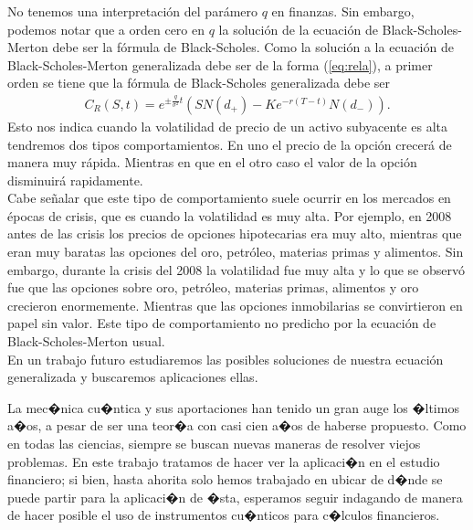 \documentclass[portrait, a0b,final]{a0poster}%
\numberwithin{equation}{section}
\newenvironment{poster}{
  \begin{center}
  \begin{minipage}[c]{0.98\textwidth}
}{
  \end{minipage}
  \end{center}
}
\newenvironment{pcolumn}[1]{
  \begin{minipage}{#1\textwidth}
  \begin{center}
}{
  \end{center}
  \end{minipage}
}
\newcommand{\pbox}[4]{
\psshadowbox[#3]{
\begin{minipage}[t][#2][t]{#1}
#4
\end{minipage}
}}
\begin{document}
\begin{poster}
\begin{center}
\begin{pcolumn}{0.32}
{No tenemos una interpretaci\'on del par\'amero $q$ en finanzas. Sin embargo, podemos notar que a orden cero en $q$ la soluci\'on de la ecuaci\'on de Black-Scholes-Merton 
debe ser la f\'ormula de Black-Scholes. Como la soluci\'on a la ecuaci\'on de Black-Scholes-Merton generalizada  
debe ser   de la forma (\ref{eq:rela}),  a primer orden se tiene que la f\'ormula de Black-Scholes generalizada debe ser 
%
\begin{eqnarray}
C_{R}(S,t)= e^{\pm \frac{q}{\sigma^{2}} t}  \left(SN(d_{+})-Ke^{-r(T-t)} N(d_{-}) \right).
\end{eqnarray}
%  
Esto nos indica cuando la volatilidad de precio de un activo subyacente es alta tendremos dos tipos comportamientos.
En uno el  precio de la opci\'on crecer\'a de manera muy r\'apida. Mientras en que en el otro caso el valor de la opci\'on 
disminuir\'a rapidamente.\\

Cabe se\~nalar que este tipo de comportamiento suele  ocurrir en los mercados  en \'epocas de crisis, que es cuando la volatilidad es muy alta.
Por ejemplo, en 2008 antes de las crisis los precios de opciones hipotecarias era muy alto, mientras que eran muy baratas  las opciones del oro, petr\'oleo,  materias primas y  alimentos.  Sin embargo, durante la crisis del 2008 la volatilidad fue muy alta y lo que se observ\'o fue que las opciones sobre oro, petr\'oleo, materias primas, alimentos y oro crecieron enormemente. Mientras que las opciones  inmobilarias  se convirtieron en papel sin  valor. Este tipo de comportamiento no predicho  por la ecuaci\'on de Black-Scholes-Merton usual.\\

En un trabajo futuro estudiaremos las posibles soluciones de nuestra ecuaci\'on generalizada y buscaremos  aplicaciones ellas. 
   
\vspace{2cm}
\begin{center}
        \pbox{0.8\textwidth}{}%
        {linewidth=2mm,framearc=0.1,linecolor=lightblue,fillstyle=gradient,gradangle=0,%
        gradbegin=white,gradend=whiteblue,gradmidpoint=1.0,framesep=1em}{
        \begin{center}
            Conclusiones
        \end{center}}
\end{center}    
    \vspace{1.25cm}
\setcounter{section}{5}%
\setcounter{equation}{0}%
La mec�nica cu�ntica y sus aportaciones han tenido un gran auge los �ltimos a�os, a pesar de ser una teor�a con casi cien a�os de haberse propuesto. Como en todas las ciencias, siempre se buscan nuevas maneras de resolver viejos problemas. En este trabajo tratamos de hacer ver la aplicaci�n en el estudio financiero; si bien, hasta ahorita solo hemos trabajado en ubicar de d�nde se puede partir para la aplicaci�n de �sta, esperamos seguir indagando de manera de hacer posible el uso de instrumentos cu�nticos para c�lculos financieros.

}
\end{pcolumn}
\end{center}
\end{poster}
\end{document}
